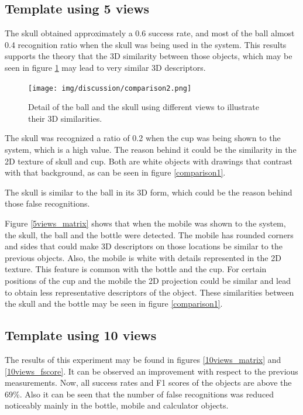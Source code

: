 
	\subsection{Template using 5 views}
	\label{discussion_5views}

	The skull obtained approximately a 0.6 success rate, and most of the ball almost 0.4 recognition ratio when the skull was being used in the system. 
	This results supports the theory that the 3D similarity between those objects, which may be seen in figure \ref{comparison2} may lead to very similar 3D descriptors. 

	\begin{figure}[h]
		\begin{center}
	    \texttt{[image: img/discussion/comparison2.png]}
		\caption[Comparison: ball and skull]{Detail of the ball and the skull using different views to illustrate their 3D similarities. }
		\label{comparison2}
		\end{center}
	\end{figure}


	The skull was recognized a ratio of 0.2 when the cup was being shown to the system, which is a high value. 
	The reason behind it could be the similarity in the 2D texture of skull and cup. 
	Both are white objects with drawings that contrast with that background, as can be seen in figure \ref{comparison1}. 
	
		The skull is similar to the ball in its 3D form, which could be the reason behind those false recognitions. 

	Figure \ref{5views_matrix} shows that when the mobile was shown to the system, the skull, the ball and the bottle were detected. 
	The mobile has rounded corners and sides that could make 3D descriptors on those locations be similar to the previous objects. 
	Also, the mobile is white with details represented in the 2D texture. 
	This feature is common with the bottle and the cup. 
	For certain positions of the cup and the mobile the 2D projection could be similar and lead to obtain less representative descriptors of the object. 
	These similarities between the skull and the bottle may be seen in figure \ref{comparison1}.


	\subsection{Template using 10 views}
	The results of this experiment may be found in figures \ref{10views_matrix} and \ref{10views_fscore}. 
	It can be observed an improvement with respect to the previous measurements. 
	Now, all success rates and F1 scores of the objects are above the 69\%. 
	Also it can be seen that the number of false recognitions was reduced noticeably mainly in the bottle, mobile and calculator objects. 
	\\

